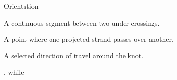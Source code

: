 \begin{labeling}{Orientation}
\item[\texttt{Arc}]
A continuous segment between two under-crossings.

\item[\texttt{Crossing}]
A point where one projected strand passes over another.

\item[\texttt{Orientation}]
A selected direction of travel around the knot.
\end{labeling}

, while 


